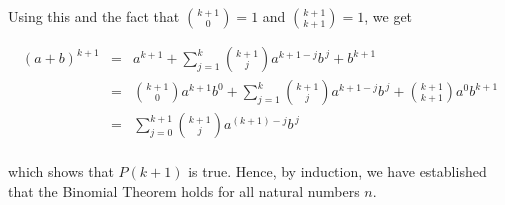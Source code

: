 \documentclass{ximera}
\begin{document}
Using this and the fact that $\binom{k+1}{0} = 1$ and $\binom{k+1}{k+1} = 1$, we get

\[ \begin{array}{rcl}

(a+b)^{k+1} & = & a^{k+1} + \displaystyle{\sum_{j=1}^{k} \binom{k+1}{j} a^{k+1-j} b^{\, j} } + b^{k+1} \\ [15pt]
            & = & \displaystyle{ \binom{k+1}{0} a^{k+1} b^{0} + \sum_{j=1}^{k} \binom{k+1}{j} a^{k+1-j} b^{\, j}  + \binom{k+1}{k+1} a^{0} b^{k+1}} \\ [15pt]
            & = & \displaystyle{  \sum_{j=0}^{k+1} \binom{k+1}{j} a^{(k+1)-j} b^{\, j}} \\ [15pt]
 \end{array}\]
 
which shows that $P(k+1)$ is true.  Hence, by induction, we have established that the Binomial Theorem holds for all natural numbers $n$.
\end{document}
